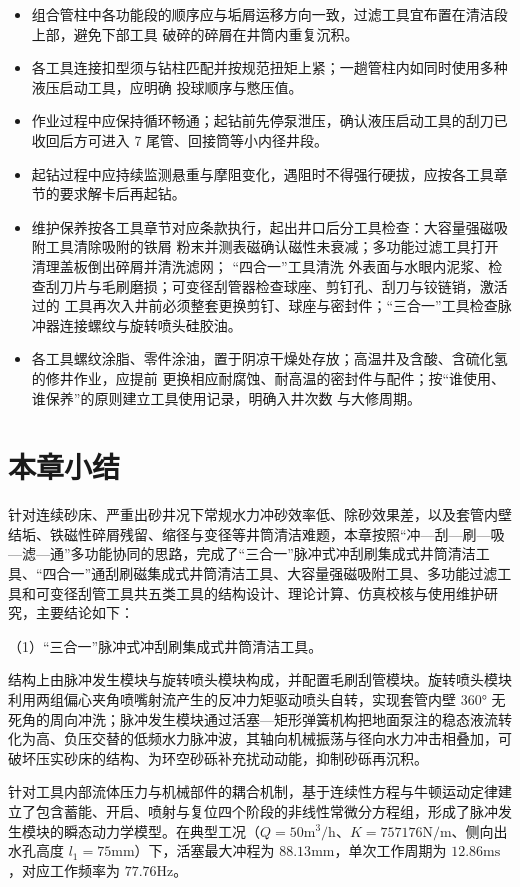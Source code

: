 \begin{itemize}
	\item 组合管柱中各功能段的顺序应与垢屑运移方向一致，过滤工具宜布置在清洁段上部，避免下部工具
	破碎的碎屑在井筒内重复沉积。
	\item 各工具连接扣型须与钻柱匹配并按规范扭矩上紧；一趟管柱内如同时使用多种液压启动工具，应明确
	投球顺序与憋压值。
	\item 作业过程中应保持循环畅通；起钻前先停泵泄压，确认液压启动工具的刮刀已收回后方可进入 7\inch
	尾管、回接筒等小内径井段。
	\item 起钻过程中应持续监测悬重与摩阻变化，遇阻时不得强行硬拔，应按各工具章节的要求解卡后再起钻。
	\item 维护保养按各工具章节对应条款执行，起出井口后分工具检查：大容量强磁吸附工具清除吸附的铁屑
	粉末并测表磁确认磁性未衰减；多功能过滤工具打开清理盖板倒出碎屑并清洗滤网； “四合一”工具清洗
	外表面与水眼内泥浆、检查刮刀片与毛刷磨损；可变径刮管器检查球座、剪钉孔、刮刀与铰链销，激活过的
	工具再次入井前必须整套更换剪钉、球座与密封件；“三合一”工具检查脉冲器连接螺纹与旋转喷头硅胶油。
	\item 各工具螺纹涂脂、零件涂油，置于阴凉干燥处存放；高温井及含酸、含硫化氢的修井作业，应提前
	更换相应耐腐蚀、耐高温的密封件与配件；按“谁使用、谁保养”的原则建立工具使用记录，明确入井次数
	与大修周期。
\end{itemize}

\section{本章小结}

针对连续砂床、严重出砂井况下常规水力冲砂效率低、除砂效果差，以及套管内壁结垢、铁磁性碎屑残留、缩径与变径等井筒清洁难题，本章按照“冲—刮—刷—吸—滤—通”多功能协同的思路，完成了“三合一”脉冲式冲刮刷集成式井筒清洁工具、“四合一”通刮刷磁集成式井筒清洁工具、大容量强磁吸附工具、多功能过滤工具和可变径刮管工具共五类工具的结构设计、理论计算、仿真校核与使用维护研究，主要结论如下：

（1）“三合一”脉冲式冲刮刷集成式井筒清洁工具。

结构上由脉冲发生模块与旋转喷头模块构成，并配置毛刷刮管模块。旋转喷头模块利用两组偏心夹角喷嘴射流产生的反冲力矩驱动喷头自转，实现套管内壁 360° 无死角的周向冲洗；脉冲发生模块通过活塞—矩形弹簧机构把地面泵注的稳态液流转化为高、负压交替的低频水力脉冲波，其轴向机械振荡与径向水力冲击相叠加，可破坏压实砂床的结构、为环空砂砾补充扰动动能，抑制砂砾再沉积。
	
针对工具内部流体压力与机械部件的耦合机制，基于连续性方程与牛顿运动定律建立了包含蓄能、开启、喷射与复位四个阶段的非线性常微分方程组，形成了脉冲发生模块的瞬态动力学模型。在典型工况（$Q=50\mathrm{m^3/h}$、$K=757176\mathrm{N/m}$、侧向出水孔高度 $l_1=75\mathrm{mm}$）下，活塞最大冲程为 $88.13\mathrm{mm}$，单次工作周期为 $12.86\mathrm{ms}$，对应工作频率为 $77.76\mathrm{Hz}$。
	
